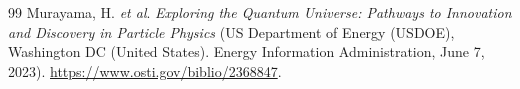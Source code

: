 
\ifdefined\biblatexflag
\printbibliography[heading=bibnumbered,title={Bibliography \& References Cited}]
\else
\begin{thebibliography}{99}
        Murayama, H. \emph{et al}.
        \emph{Exploring the Quantum Universe: Pathways to Innovation and Discovery in Particle Physics}
        (US Department of Energy (USDOE), Washington DC (United States). Energy Information Administration, June 7, 2023).
        \url{https://www.osti.gov/biblio/2368847}.
\end{thebibliography}
\fi
